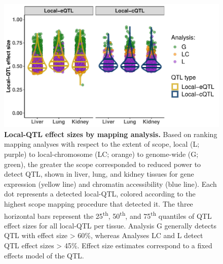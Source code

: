 \documentclass[9pt,twocolumn,twoside]{gsajnl}
\begin{document}
\begin{figure}[h]
\centering
\includegraphics[width=\textwidth, trim={0in 0in 0in 0in}, clip]{figs/local_qtl_effects.pdf}
\caption{\textbf{Local-QTL effect sizes by mapping analysis.} Based on ranking mapping analyses with respect to the extent of scope, local (L; purple) to local-chromosome (LC; orange) to genome-wide (G; green), the greater the scope corresponded to reduced power to detect QTL, shown in liver, lung, and kidney tissues for gene expression (yellow line) and chromatin accessibility (blue line). Each dot represents a detected local-QTL, colored according to the highest scope mapping procedure that detected it. The three horizontal bars represent the 25\textsuperscript{th}, 50\textsuperscript{th}, and 75\textsuperscript{th} quantiles of QTL effect sizes for all local-QTL per tissue. Analysis G generally detects QTL with effect size > 60\%, whereas Analyses LC and L detect QTL effect sizes > 45\%. Effect size estimates correspond to a fixed effects model of the QTL.
\label{fig:qtl_effect_sizes_by_method}}
\end{figure}
\end{document}
